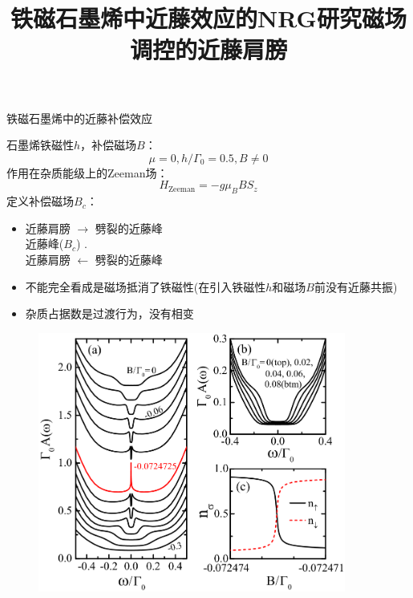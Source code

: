 \documentclass[9pt,t]{beamer} %
\begin{document}
\title{铁磁石墨烯中近藤效应的NRG研究\qquad \qquad \qquad \qquad 磁场调控的近藤肩膀}
\begin{frame}{铁磁石墨烯中的近藤补偿效应}
\vspace{0.5cm}
\begin{minipage}[t]{0.55 \textwidth}
石墨烯铁磁性$h$，补偿磁场$B$：
\[\mu=0, h/\Gamma_{0}= 0.5, B\neq 0\]
作用在杂质能级上的Zeeman场：
\begin{equation}\nonumber
H_{\mathrm{Zeeman}}=-g \mu_{B} B S_{z}
\end{equation}
定义补偿磁场$B_{c}$：\\
\vspace{-0.5cm}
\vspace{0.2cm}
\begin{itemize}
\item 近藤肩膀 $\rightarrow$ 劈裂的近藤峰  \\
\hfill{近藤峰($B_{c}$) \hspace{1cm}}.\\
近藤肩膀 $\leftarrow$ 劈裂的近藤峰 
\item 不能完全看成是磁场抵消了铁磁性(在引入铁磁性$h$和磁场$B$前没有近藤共振)
\item 杂质占据数是过渡行为，没有相变
\end{itemize}
\end{minipage}%
\begin{minipage}[t]{0.55 \textwidth}
\begin{figure}
\hspace{-1.2cm}
\includegraphics[width=0.9\textwidth]{fig5.png}
\end{figure}
\end{minipage}
\vspace{0.12cm}
\end{frame}
\end{document}
